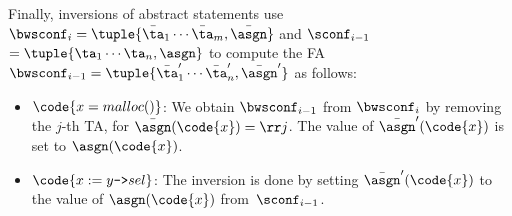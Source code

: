 Finally, inversions of abstract statements
use $\bwsconf_{i} = \tuple{\bar\ta_1 \cdots \bar\ta_m, \bar\asgn}$ and
$\sconf_{i-1}$ $= \tuple{\ta_1 \cdots \ta_n, \asgn}$
to
compute the FA $\bwsconf_{i-1} =
\tuple{\bar\ta'_1 \cdots \bar\ta'_n, \bar\asgn'}$
as follows:
%
\begin{itemize}
  \item $\code{x = malloc()}$: We obtain $\bwsconf_{i-1}$ from $\bwsconf_{i}$
    by removing the $j$-th TA, for $\bar\asgn(\code{x}) = \rr j$.
    The value of $\bar\asgn'(\code{x})$ is set to $\asgn(\code{x})$.

  \item $\code{x := y\text{\texttt{->}}sel}$:
The inversion is done by setting $\bar\asgn'(\code{x})$ to the value of
$\asgn(\code{x})$ from~$\sconf_{i-1}$.
%


\end{itemize}

